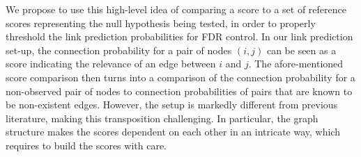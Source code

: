 \documentclass[a4paper, 11pt]{article}
\theoremstyle{remark}
\begin{document}






We propose to use this high-level idea of comparing a score to a set of reference scores representing the null hypothesis being tested,
in order to properly threshold the link prediction probabilities for FDR control. 
In our link prediction set-up, the connection probability for a pair of nodes $(i,j)$ can be seen as a score indicating the relevance of an edge between $i$ and $j$. The afore-mentioned score comparison then turns into a comparison of %
the connection probability for a non-observed pair of nodes to connection probabilities of pairs that are known to be non-existent edges. However, the setup is markedly different from previous literature, making this transposition challenging. In particular, the graph structure makes the scores dependent on each other in an intricate way, which requires 
to build the scores with care.%
\end{document}
